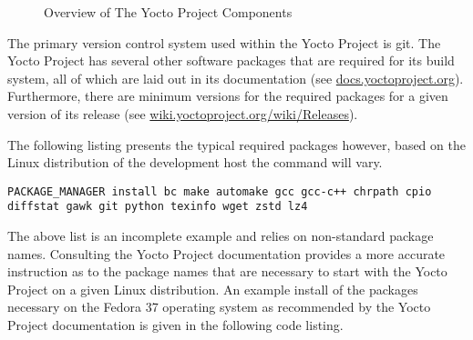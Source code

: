 \begin{figure}[h]
	\caption{Overview of The Yocto Project Components}
	\label{fig:yocto-overview}
\end{figure}

The primary version control system used within the Yocto Project is git. The Yocto Project has several other software packages that are required for its build system, all of which are laid out in its documentation (see \href{https://docs.yoctoproject.org/}{docs.yoctoproject.org}). Furthermore, there are minimum versions for the required packages for a given version of its release (see \href{https://wiki.yoctoproject.org/wiki/Releases}{wiki.yoctoproject.org/wiki/Releases}).

The following listing presents the typical required packages however, based on the Linux distribution of the development host the command will vary.

\begin{verbatim}
PACKAGE_MANAGER install bc make automake gcc gcc-c++ chrpath cpio diffstat gawk git python texinfo wget zstd lz4
\end{verbatim}

The above list is an incomplete example and relies on non-standard package names. Consulting the Yocto Project documentation provides a more accurate instruction as to the package names that are necessary to start with the Yocto Project on a given Linux distribution. An example install of the packages necessary on the Fedora 37 operating system as recommended by the Yocto Project documentation is given in the following code listing.

